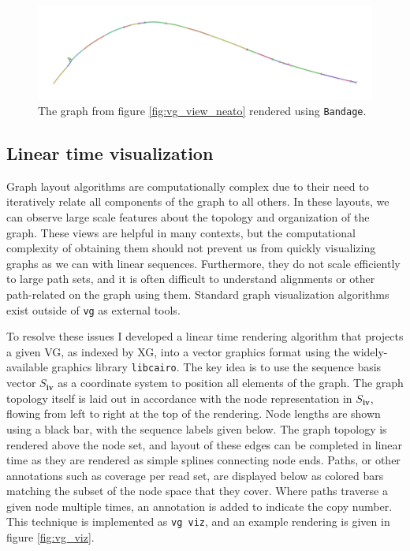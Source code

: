 \begin{figure}[htbp!] 
\centering    
\includegraphics[width=1.0\textwidth]{Chapter2/Figs/Vector/vg_view_H-3136_Bandage.pdf}
\caption{The graph from figure \ref{fig:vg_view_neato} rendered using {\tt Bandage}.}
\label{fig:vg_view_bandage}
\end{figure}

\subsection{Linear time visualization}

Graph layout algorithms are computationally complex due to their need to iteratively relate all components of the graph to all others.
In these layouts, we can observe large scale features about the topology and organization of the graph.
These views are helpful in many contexts, but the computational complexity of obtaining them should not prevent us from quickly visualizing graphs as we can with linear sequences.
Furthermore, they do not scale efficiently to large path sets, and it is often difficult to understand alignments or other path-related on the graph using them.
Standard graph visualization algorithms exist outside of {\tt vg} as external tools.

To resolve these issues I developed a linear time rendering algorithm that projects a given VG, as indexed by XG, into a vector graphics format using the widely-available graphics library {\tt libcairo}.
The key idea is to use the sequence basis vector $S_\textbf{iv}$ as a coordinate system to position all elements of the graph.
The graph topology itself is laid out in accordance with the node representation in $S_\textbf{iv}$, flowing from left to right at the top of the rendering.
Node lengths are shown using a black bar, with the sequence labels given below.
The graph topology is rendered above the node set, and layout of these edges can be completed in linear time as they are rendered as simple splines connecting node ends.
Paths, or other annotations such as coverage per read set, are displayed below as colored bars matching the subset of the node space that they cover.
Where paths traverse a given node multiple times, an annotation is added to indicate the copy number.
This technique is implemented as {\tt vg viz}, and an example rendering is given in figure \ref{fig:vg_viz}.

